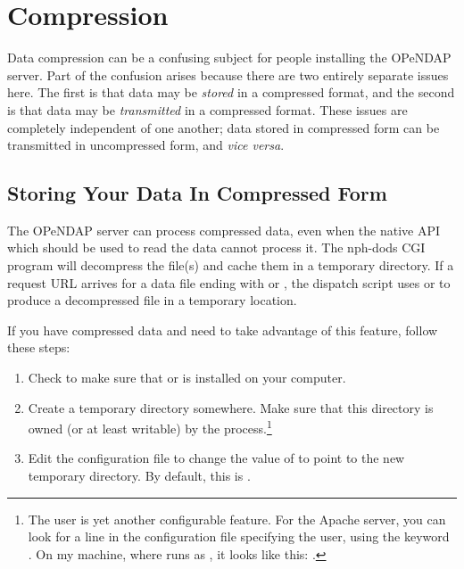 \documentclass{dods-book}
\begin{document}
\section{Compression}

 Data compression can be a
confusing subject for people installing the OPeNDAP server. Part of
the confusion arises because there are two entirely separate issues
here. The first is that data may be \emph{stored} in a compressed
format, and the second is that data may be \emph{transmitted} in a
compressed format. These issues are completely independent of one
another; data stored in compressed form can be transmitted in
uncompressed form, and \emph{vice versa}.

\subsection{Storing Your Data In Compressed Form}

 The OPeNDAP
server can process compressed data, even when the native API which
should be used to read the data cannot process it. The nph-dods CGI
program will decompress the file(s) and cache them in a temporary
directory. If a request URL arrives for a data file ending with
 or , the dispatch script uses  or
 to produce a decompressed file in a temporary location.

If you have compressed data and need to take advantage of this
feature, follow these steps:

\begin{enumerate}
\item Check to make sure that  or  is
  installed on your computer.
  
\item Create a temporary directory somewhere.  Make sure that this
  directory is owned (or at least writable) by the 
  process.\footnote{The user is yet another configurable feature.  For
    the Apache server, you can look for a line in the configuration
    file specifying the user, using the keyword .  On my
    machine, where  runs as , it looks like
    this: .}

\item Edit the  configuration file to change the
  value of  to point to the new temporary directory.
  By default, this is .

\end{enumerate}
\end{document}
